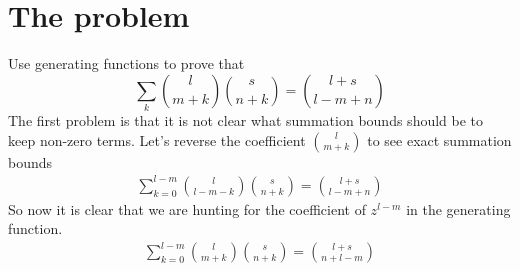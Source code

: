 ﻿\documentclass{article}
\begin{document}
    \section{The problem}\label{sec:the-problem}
    Use generating functions to prove that
    \begin{equation}
        \sum_{k} \binom{l}{m+k} \binom{s}{n+k} = \binom{l+s}{l-m+n}
        \label{eq:identity-to-prove}
    \end{equation}
    The first problem is that it is not clear what summation bounds should be to keep non-zero terms.
    Let's reverse the coefficient $\binom{l}{m+k}$ to see exact summation bounds
    \begin{align*}
        \sum_{k=0}^{l-m} \binom{l}{l-m-k} \binom{s}{n+k} = \binom{l+s}{l-m+n}
    \end{align*}
    So now it is clear that we are hunting for the coefficient of $z^{l-m}$ in the generating function.
    \begin{align*}
        \sum_{k=0}^{l-m} \binom{l}{m+k} \binom{s}{n+k} = \binom{l+s}{n+l-m}
    \end{align*}
\end{document}
